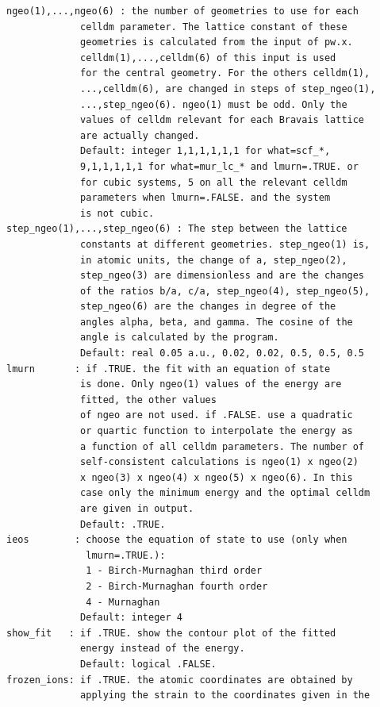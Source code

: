 \documentclass[12pt,a4paper,twoside]{report}
\begin{document}
\begin{verbatim}
ngeo(1),...,ngeo(6) : the number of geometries to use for each 
             celldm parameter. The lattice constant of these 
             geometries is calculated from the input of pw.x. 
             celldm(1),...,celldm(6) of this input is used 
             for the central geometry. For the others celldm(1),
             ...,celldm(6), are changed in steps of step_ngeo(1),
             ...,step_ngeo(6). ngeo(1) must be odd. Only the 
             values of celldm relevant for each Bravais lattice 
             are actually changed.
             Default: integer 1,1,1,1,1,1 for what=scf_*, 
             9,1,1,1,1,1 for what=mur_lc_* and lmurn=.TRUE. or 
             for cubic systems, 5 on all the relevant celldm 
             parameters when lmurn=.FALSE. and the system
             is not cubic.
step_ngeo(1),...,step_ngeo(6) : The step between the lattice 
             constants at different geometries. step_ngeo(1) is, 
             in atomic units, the change of a, step_ngeo(2), 
             step_ngeo(3) are dimensionless and are the changes 
             of the ratios b/a, c/a, step_ngeo(4), step_ngeo(5), 
             step_ngeo(6) are the changes in degree of the 
             angles alpha, beta, and gamma. The cosine of the 
             angle is calculated by the program.
             Default: real 0.05 a.u., 0.02, 0.02, 0.5, 0.5, 0.5
lmurn       : if .TRUE. the fit with an equation of state
             is done. Only ngeo(1) values of the energy are 
             fitted, the other values 
             of ngeo are not used. if .FALSE. use a quadratic 
             or quartic function to interpolate the energy as 
             a function of all celldm parameters. The number of 
             self-consistent calculations is ngeo(1) x ngeo(2) 
             x ngeo(3) x ngeo(4) x ngeo(5) x ngeo(6). In this 
             case only the minimum energy and the optimal celldm 
             are given in output. 
             Default: .TRUE. 
ieos        : choose the equation of state to use (only when 
              lmurn=.TRUE.):
              1 - Birch-Murnaghan third order
              2 - Birch-Murnaghan fourth order
              4 - Murnaghan
             Default: integer 4
show_fit   : if .TRUE. show the contour plot of the fitted 
             energy instead of the energy. 
             Default: logical .FALSE.
frozen_ions: if .TRUE. the atomic coordinates are obtained by 
             applying the strain to the coordinates given in the 

\end{verbatim}
\end{document}

